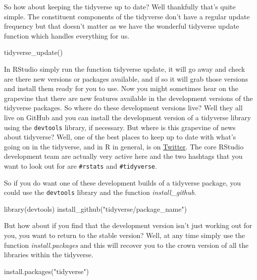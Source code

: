 \documentclass[
]{article}
\newenvironment{Shaded}{\begin{snugshade}}{\end{snugshade}}
\newcommand{\FunctionTok}[1]{\textcolor[rgb]{0.00,0.00,0.00}{#1}}
\newcommand{\NormalTok}[1]{#1}
\newcommand{\StringTok}[1]{\textcolor[rgb]{0.31,0.60,0.02}{#1}}
\begin{document}
So how about keeping the tidyverse up to date? Well thankfully that's quite simple. The constituent components of the tidyverse don't have a regular update frequency but that doesn't matter as we have the wonderful tidyverse update function which handles everything for us.

\begin{Shaded}
\begin{Highlighting}[]
\FunctionTok{tidyverse\_update}\NormalTok{()}
\end{Highlighting}
\end{Shaded}

In RStudio simply run the function tidyverse update, it will go away and check are there new versions or packages available, and if so it will grab those versions and install them ready for you to use. Now you might sometimes hear on the grapevine that there are new features available in the development versions of the tidyverse packages. So where do these development versions live? Well they all live on GitHub and you can install the development version of a tidyverse library using the \texttt{devtools} library, if necessary. But where is this grapevine of news about tidyverse? Well, one of the best places to keep up to date with what's going on in the tidyverse, and in R in general, is on \href{https://twitter.com/tidyverse}{Twitter}. The core RStudio development team are actually very active here and the two hashtags that you want to look out for are \texttt{\#rstats} and \texttt{\#tidyverse}.

So if you do want one of these development builds of a tidyverse package, you could use the \texttt{devtools} library and the function \emph{install\_github}.

\begin{Shaded}
\begin{Highlighting}[]
\FunctionTok{library}\NormalTok{(devtools)}
\FunctionTok{install\_github}\NormalTok{(}\StringTok{"tidyverse/package\_name"}\NormalTok{)}
\end{Highlighting}
\end{Shaded}

But how about if you find that the development version isn't just working out for you, you want to return to the stable version? Well, at any time simply use the function \emph{install.packages} and this will recover you to the crown version of all the libraries within the tidyverse.

\begin{Shaded}
\begin{Highlighting}[]
\FunctionTok{install.packages}\NormalTok{(}\StringTok{"tidyverse"}\NormalTok{)}
\end{Highlighting}
\end{Shaded}
\end{document}
